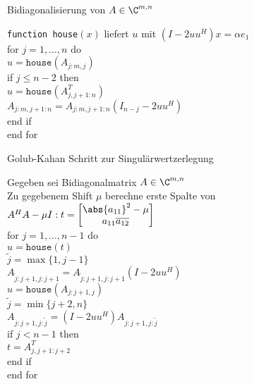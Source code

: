 \begin{karte}{Bidiagonalisierung von \(A\in \C^{m,n}\)}
    \begin{tabbing}
        { \texttt{function house}\((x)\) liefert \(u\) mit \((I - 2 u u^H)x = \alpha e_1\)} \\
        for \= \( j = 1,\ldots,n \) do \\
        \> \(u = \texttt{house}(A_{j:m, j})\) \\
        \> if \= \(j \leq n-2\) then \\
        \> \> \(u = \texttt{house}(A_{j,j+1:n}^T)\) \\
        \> \> \( A_{j:m, j+1:n} = A_{j:m,j+1:n}(I_{n-j} - 2 u u^H) \) \\
        \> end if \\
        end for
    \end{tabbing}
\end{karte}

\begin{karte}{Golub-Kahan Schritt zur Singulärwertzerlegung}
    \begin{tabbing}
        Gegeben sei Bidiagonalmatrix \(A \in \C^{m,n}\) \\
        Zu gegebenem Shift \(\mu\) berechne erste Spalte von \(A^H A - \mu I: t = \left[ \begin{matrix}
            \abs{a_{11}}^2 - \mu \\ a_{11} \overline{a_{12}}
        \end{matrix} \right]\) \\
        for \= \( j = 1 ,\ldots,n-1 \) do \\
        \> \(u = \texttt{house}(t)\) \\
        \> \( \tilde{j} = \max\{1, j-1\} \) \\
        \> \( A_{\tilde{j}:j+1, j:j+1} = A_{\tilde{j}:j+1, j:j+1}(I - 2 u u^H) \) \\
        \> \( u = \texttt{house}(A_{j:j+1, j}) \) \\
        \> \( \tilde{j} = \min\{j+2, n\} \) \\
        \> \( A_{j:j+1, j:\tilde{j}} = (I - 2 u u^H) A_{j:j+1, j:\tilde{j}} \) \\
        \> if \=\(j < n-1\) then \\
        \> \> \( t = A_{j,j+1:j+2}^T \) \\
        \> end if \\
        end for
    \end{tabbing}
\end{karte}

